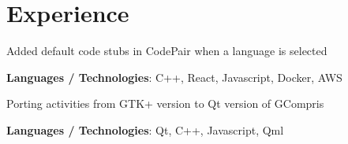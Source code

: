 \documentclass[]{rudra-resume-openfont}
\begin{document}
\begin{minipage}[t]{0.66\textwidth} 


\section{Experience}

\vspace{\topsep} %
\begin{tightemize}
\item Added default code stubs in CodePair when a language is selected
\item \textbf{Languages / Technologies}: C++, React, Javascript, Docker, AWS
\end{tightemize}

\vspace{\topsep} %
\begin{tightemize}
\item Porting activities from GTK+ version to Qt version of GCompris
\item \textbf{Languages / Technologies}: Qt, C++, Javascript, Qml
\end{tightemize}

\sectionsep




\end{minipage}
\end{document}
